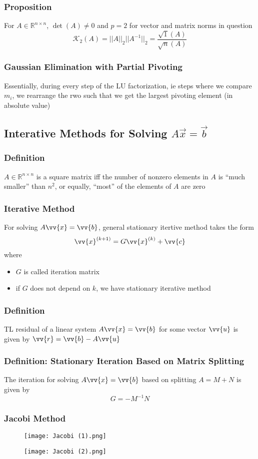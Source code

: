 \documentclass[11pt]{article}
\newcommand{\R}{{\mathbb{R}}}
\newcommand{\vb}{\vv{b}}
\newcommand{\vc}{\vv{c}}
\newcommand{\vr}{\vv{r}}
\newcommand{\vu}{\vv{u}}
\newcommand{\vx}{\vv{x}}
\begin{document}
\subsubsection{Proposition}
For $A\in\R^{n\times n}$, $\det(A)\neq0$ and $p=2$ for vector and matrix norms in question
\[\mathcal{K}_2(A) = ||A||_2||A^{-1}||_2 = \dfrac{\sqrt{1}(A)}{\sqrt{n}(A)}\]
\subsubsection{Gaussian Elimination with Partial Pivoting}
Essentially, during every step of the LU factorization,
ie steps where we compare $m_i$, we rearrange the rwo such that 
we get the largest pivoting element (in absolute value)
\subsection{Interative Methods for Solving $A\vec{x} = \vec{b}$}
\subsubsection{Definition}
$A\in\R^{n\times n}$ is a square matrix iff the number of nonzero elements in $A$ is  ``much smaller'' than $n^2$,
or equally, ``most'' of the elements of $A$ are zero 
\subsubsection{Iterative Method}
For solving $A\vx=\vb$, general stationary itertive method takes the form 
\[\vx^{(k+1)} = G\vx^{(k)}+\vc\]
where 
\begin{itemize}
  \item $G$ is called iteration matrix 
  \item if $G$ does not depend on $k$, we have stationary iterative method 
\end{itemize}
\subsubsection{Definition}
TL residual of a linear system $A\vx=\vb$ for some vector $\vu$ is given by $\vr = \vb-A\vu$
\subsubsection{Definition: Stationary Iteration Based on Matrix Splitting}
The iteration for solving $A\vx=\vb$ based on splitting $A=M+N$ is given by 
\[G = -M^{-1}N\]
\newpage
\subsubsection{Jacobi Method}
\begin{figure}[tbhp]
	\begin{center}
		\texttt{[image: Jacobi (1).png]}
	\end{center}
	\label{figcaption}
\end{figure}
\begin{figure}[tbhp]
	\begin{center}
		\texttt{[image: Jacobi (2).png]}
	\end{center}
	\label{figcaption}
\end{figure}
\newpage
\end{document}

